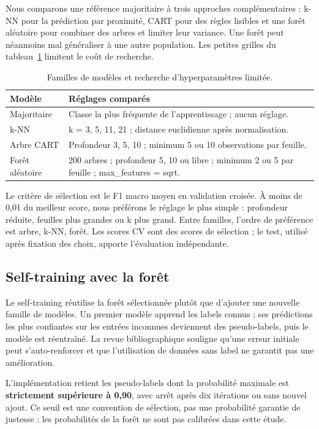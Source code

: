 \documentclass[10pt,a4paper]{article}
\begin{document}
Nous comparons une référence majoritaire à trois approches complémentaires : k-NN pour la prédiction par proximité, CART pour des règles lisibles et une forêt aléatoire pour combiner des arbres et limiter leur variance. Une forêt peut néanmoins mal généraliser à une autre population. Les petites grilles du tableau~\ref{tab:grid} limitent le coût de recherche.

\begin{table}[H]\centering\small
\begin{tabularx}{\linewidth}{p{.22\linewidth}X}
\toprule
\textbf{Modèle} & \textbf{Réglages comparés} \\
\midrule
Majoritaire & Classe la plus fréquente de l'apprentissage ; aucun réglage. \\
k-NN & k = 3, 5, 11, 21 ; distance euclidienne après normalisation. \\
Arbre CART & Profondeur 3, 5, 10 ; minimum 5 ou 10 observations par feuille. \\
Forêt aléatoire & 200 arbres ; profondeur 5, 10 ou libre ; minimum 2 ou 5 par feuille ; max\_features = sqrt. \\
\bottomrule
\end{tabularx}
\caption{Familles de modèles et recherche d'hyperparamètres limitée.}\label{tab:grid}
\end{table}

Le critère de sélection est le F1 macro moyen en validation croisée. À moins de 0,01 du meilleur score, nous préférons le réglage le plus simple : profondeur réduite, feuilles plus grandes ou k plus grand. Entre familles, l'ordre de préférence est arbre, k-NN, forêt. Les scores CV sont des scores de sélection ; le test, utilisé après fixation des choix, apporte l'évaluation indépendante.

\subsection{Self-training avec la forêt}

Le self-training réutilise la forêt sélectionnée plutôt que d'ajouter une nouvelle famille de modèles. Un premier modèle apprend les labels connus ; ses prédictions les plus confiantes sur les entrées inconnues deviennent des pseudo-labels, puis le modèle est réentraîné. La revue bibliographique souligne qu'une erreur initiale peut s'auto-renforcer et que l'utilisation de données sans label ne garantit pas une amélioration\cite{zhu}.

L'implémentation retient les pseudo-labels dont la probabilité maximale est \textbf{strictement supérieure à 0,90}, avec arrêt après dix itérations ou sans nouvel ajout\cite{sklearn}. Ce seuil est une convention de sélection, pas une probabilité garantie de justesse : les probabilités de la forêt ne sont pas calibrées dans cette étude.
\end{document}
